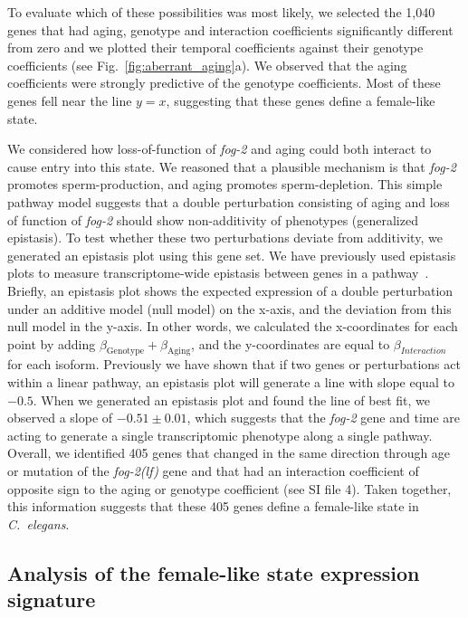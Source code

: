 \documentclass[9pt,twocolumn,twoside]{gsag3jnl}
\newcommand{\cel}{\emph{C.~elegans}}
\newcommand{\fog}{\emph{\mbox{fog-2(lf)}}}
\newcommand{\gene}[1]{\emph{\mbox{#1}}}
\newcommand{\intersectn}{1,040}
\newcommand{\femalen}{405}
\begin{document}
To evaluate which of these possibilities was most likely, we selected the
\intersectn{} genes that had aging, genotype and interaction coefficients
significantly different from zero and we plotted their temporal coefficients
against their genotype coefficients (see Fig.~\ref{fig:aberrant_aging}a). We
observed that the aging coefficients were strongly predictive of the genotype
coefficients. Most of these genes fell near the line $y=x$, suggesting that
these genes define a female-like state.

We considered how loss-of-function of \gene{fog-2} and aging could both interact
to cause entry into this state. We reasoned that a plausible mechanism is that
\gene{fog-2} promotes sperm-production, and aging promotes sperm-depletion. This
simple pathway model suggests that a double perturbation consisting of aging and
loss of function of \gene{fog-2} should show non-additivity of phenotypes
(generalized epistasis). To test whether these two perturbations deviate from
additivity, we generated an epistasis plot using this gene set. We
have previously used epistasis plots to measure transcriptome-wide epistasis
between genes in a pathway~\citep{Angeles-Albores2017}. Briefly, an epistasis
plot shows the expected expression of a double perturbation under an additive
model (null model) on the x-axis, and the deviation from this null model in the
y-axis. In other words, we calculated the x-coordinates for each point by adding
$\beta_\mathrm{Genotype} + \beta_\mathrm{Aging}$, and the y-coordinates are
equal to $\beta_{Interaction}$ for each isoform. Previously we have shown that
if two genes or perturbations act within a linear pathway, an epistasis plot
will generate a line with slope equal to $-0.5$. When we generated an epistasis
plot and found the line of best fit, we observed a slope of $-0.51\pm 0.01$,
which suggests that the \gene{fog-2} gene and time are acting to generate a
single transcriptomic phenotype along a single pathway. Overall, we identified
\femalen{} genes that changed in the same direction through age or mutation of
the \fog{} gene and that had an interaction coefficient of opposite sign to the
aging or genotype coefficient (see SI file 4). Taken together, this information
suggests that these \femalen{} genes define a female-like state in \cel{}.

\subsection*{Analysis of the female-like state expression signature}
\end{document}
